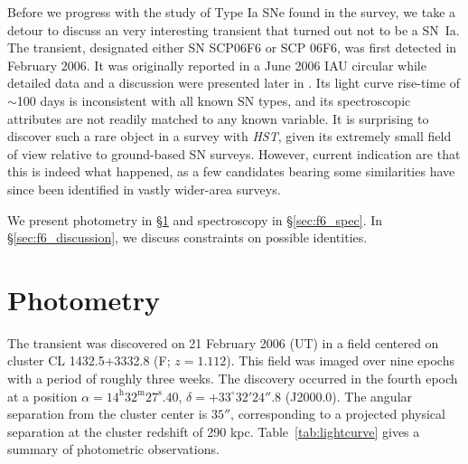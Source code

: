 Before we progress with the study of Type Ia SNe found in the survey,
we take a detour to discuss an very interesting transient that turned
out not to be a SN~Ia. The transient, designated either SN SCP06F6 or
SCP 06F6, was first detected in February 2006. It was originally
reported in a June 2006 IAU circular \citep{dawson06a} while detailed
data and a discussion were presented later in \citet{barbary09a}. Its
light curve rise-time of $\sim$100 days is inconsistent with all known
SN types, and its spectroscopic attributes are not readily matched to
any known variable. It is surprising to discover such a rare object in
a survey with \emph{HST}, given its extremely small field of view
relative to ground-based SN surveys. However, current indication are
that this is indeed what happened, as a few candidates bearing some
similarities have since been identified in vastly wider-area surveys.


We present photometry in \S\ref{sec:f6_phot} and spectroscopy in
\S\ref{sec:f6_spec}. In \S\ref{sec:f6_discussion}, we discuss
constraints on possible identities. 


\section{Photometry} \label{sec:f6_phot}

The transient was discovered on 21 February 2006 (UT) in a field
centered on cluster CL 1432.5+3332.8 (F; $z = 1.112$). This field was
imaged over nine epochs with a period of roughly three weeks.  The
 discovery occurred in the fourth epoch at a position $\alpha =
14^\mathrm{h} 32^\mathrm{m} 27^\mathrm{s}.40$, $\delta = +33^\circ 32'
24''.8$ (J2000.0).  The angular separation from the cluster center is
$35''$, corresponding to a projected physical separation at the
cluster redshift of 290 kpc.  Table~\ref{tab:lightcurve} gives a
summary of photometric observations.

